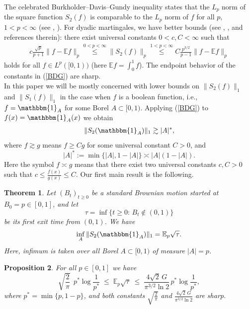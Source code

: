 \documentclass[11pt]{amsart}
\newtheorem{theorem}{Theorem}[section]
\newtheorem{proposition}[theorem]{Proposition}
\theoremstyle{definition}
\renewcommand{\1}{{\mathbbm{1}}}
\begin{document}
The celebrated Burkholder--Davis--Gundy inequality states that the $L_{p}$ norm of the square function $S_{2}(f)$ is comparable to the $L_{p}$ norm of $f$ for all $p$, $1<p<\infty$ (see \cite{BDS1}, \cite{BDS2}). For dyadic martingales, we have better bounds (see \cite{Wang1}, \cite{Wang2}, \cite{Davis} and references therein): there exist universal constants $0<c,C<\infty$ such that
\begin{align}\label{BDG}
c\frac{\sqrt{p}}{p+1}\| f-\mathbb{E}f\|_{p} \stackrel{0<p<\infty}{\leq} \|S_{2}(f)\|_{p} \stackrel{1<p<\infty}{\leq} C \frac{p^{3/2}}{p-1} \| f -\mathbb{E}f\|_{p}
\end{align}
holds for all  $f \in {L^{p}([0,1))}$ (here $\mathbb{E}f = \int_{0}^{1}f$). The endpoint behavior of the constants in (\ref{BDG}) are sharp. \\

In this paper we will be mostly concerned with lower bounds on $\|S_{2}(f)\|_{1}$ and $\|S_{1}(f)\|_{1}$ in the case when $f$ is a boolean function, i.e., $f=\mathbbm{1}_{A}$ for some Borel $A\subset  {[0,1)}$. Applying (\ref{BDG}) to $f(x)= \mathbbm{1}_{A}(x)$ we obtain 
\begin{align}\label{bestBDG}
\|S_{2}(\mathbbm{1}_{A})\|_{1} \gtrsim |A|^{*},
\end{align}
where $f \gtrsim g$ means $f \geq C g$ for some universal constant $C>0$, and  
$$
|A|^{*} := \min\{ |A|, 1-|A|\} \asymp |A| (1-|A|).
$$
Here the symbol $f\asymp g$ means that there exist two universal constants $c, C>0$ such that $c\leq \frac{f(x)}{g(x)} \leq C$. Our first main result is the following.
\begin{theorem}\label{mth01}
Let $(B_t)_{t\ge 0}$ be a standard Brownian motion started at $B_0=p\in[0,1]$, and let
\[
\tau=\inf\{t\ge 0:\, B_t\notin (0,1)\}
\]
be its first exit time from $(0,1)$. We have
\[
\inf_{A}\|S_{2}(\mathbbm{1}_{A})\|_{1}=\mathbb{E}_{p}\sqrt{\tau}.
\]
Here, infimum is taken over all Borel $A \subset {[0,1)}$ of measure $|A|=p$. 
\end{theorem}

\begin{proposition}\label{prop:const}
    For all $p \in [0,1]$ we have 
\[
\sqrt{\frac2\pi}\, \; p^*\log\frac1{p^*}
\;\le\;
\mathbb E_p\sqrt{\tau}
\;\le\;
\frac{4\sqrt2\,G}{\pi^{3/2}\ln 2}\,p^*\log\frac1{p^*},
\]
where $p^*=\min\{p,1-p\}$, and both constants $\sqrt{\frac2\pi}$ and $\frac{4\sqrt2\,G}{\pi^{3/2}\ln 2}$   are sharp.
\end{proposition}
\end{document}
